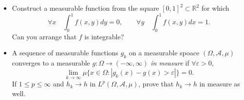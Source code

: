 \begin{itemize}
\begin{proof}
	First verify $\varphi$ essentially bounded. Pick some very big $M$, let $E_M = \{|\varphi| > M\} $, suppose $\mu(E_M) > 0$. Let $f = \chi_{E_M}$. Then $\|f\|_1 = \mu(E_M)$, and 
	\[
		\int |\varphi f| \ge \mu(E_M) M
	.\] 
	But we have $M \le c$, so such $M$ must be bounded.

	For $\varepsilon>0$, let $E_\varepsilon = \{x \in \Omega: \varphi > \|\varphi\|_\infty  - \varepsilon\} $. Define $f = \frac{1}{\mu(E_\varepsilon)} \chi_{E_\varepsilon}$. Then  $\|f\|_1 = 1$. Also we have
	\[
		\int \varphi f > \mu(E_\varepsilon) (\|\varphi\|_\infty   - \varepsilon) \frac{1}{\mu(E_\varepsilon)} = \|\varphi\|_\infty - \varepsilon
	.\] 
	This implies
	\[
		\|\varphi\|_\infty  - \varepsilon < c
	.\] 
\end{proof}


	\item Construct a measurable function from the square $[0,1]^2 \subset \mathbb{R}^2$ for which
		\[
			\forall x \quad \int _0^1 f(x,y) d y = 0, \qquad \forall  y \quad \int _0^1 f(x,y) d x = 1
		.\] 
		Can you arrange that $f$ is integrable?

	\item A sequence of measurable functions $g_k$ on a measurable spoace $(\Omega, \mathcal{A}, \mu)$ converges to a measurable $g: \Omega \to (- \infty , \infty )$ \textit{in measure} if $\forall \varepsilon>0$, 
		\[
			\lim_{k \to \infty } \mu \{x \in \Omega: \left| g_k(x) - g(x) > \varepsilon \right| \}  = 0
		.\] 
		If $1 \le p \le \infty $ and $h_k \to h$ in $L^p(\Omega, \mathcal{A}, \mu)$, prove that $h_k \to h$ in measure as well.
\end{itemize}
